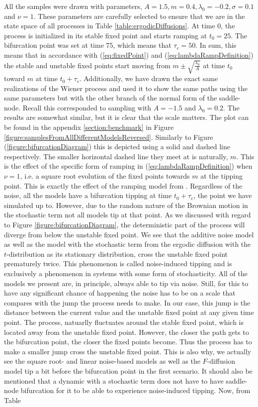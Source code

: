 All the samples were drawn with parameters, $A = 1.5, m = 0.4, \lambda_0 = -0.2, \sigma = 0.1$ and $\nu = 1$. These parameters are carefully selected to ensure that we are in the state space of all processes in Table \ref{table:ergodicDiffusions}. At time $0$, the process is initialized in its stable fixed point and starts ramping at $t_0 = 25$. The bifurcation point was set at time $75$, which means that $\tau_c = 50$. In sum, this means that in accordance with (\ref{eq:fixedPoint}) and (\ref{eq:lambdaRampDefinition}) the stable and unstable fixed points start moving from $m\pm\sqrt{\frac{\lambda_0}{A}}$ at time $t_0$ toward $m$ at time $t_0 + \tau_c$. Additionally, we have drawn the exact same realizations of the Wiener process and used it to show the same paths using the same parameters but with the other branch of the normal form of the saddle-node. Recall this corresponded to sampling with $A = -1.5$ and $\lambda_0 = 0.2$. The results are somewhat similar, but it is clear that the scale matters. The plot can be found in the appendix \ref{section:benchmark} in Figure \ref{figure:samplesFromAllDifferentModelsReversed}. Similarly to Figure (\ref{figure:bifurcationDiagram}) this is depicted using a solid and dashed line respectively. The smaller horizontal dashed line they meet at is naturally, $m$. This is the effect of the specific form of ramping in (\ref{eq:lambdaRampDefinition}) when $\nu = 1$, i.e. a square root evolution of the fixed points towards $m$ at the tipping point. This is exactly the effect of the ramping model from \cite{Ditlevsen2023}. Regardless of the noise, all the models have a bifurcation tipping at time $t_0+\tau_c$, the point we have simulated up to. However, due to the random nature of the Brownian motion in the stochastic term not all models tip at that point. As we discussed with regard to Figure \ref{figure:bifurcationDiagram}, the deterministic part of the process will diverge from below the unstable fixed point. We see that the additive noise model as well as the model with the stochastic term from the ergodic diffusion with the $t$-distribution as its stationary distribution, cross the unstable fixed point prematurely twice. This phenomenon is called noise-induced tipping and is exclusively a phenomenon in systems with some form of stochasticity. All of the models we present are, in principle, always able to tip via noise. Still, for this to have any significant chance of happening the noise has to be on a scale that compares with the jump the process needs to make. In our case, this jump is the distance between the current value and the unstable fixed point at any given time point. The process, natuarlly fluctuates around the stable fixed point, which is located away from the unstable fixed point. However, the closer the path gets to the bifurcation point, the closer the fixed points become. Thus the process has to make a smaller jump cross the unstable fixed point. This is also why, we actually see the square root- and linear noise-based models as well as the $F$-diffusion model tip a bit before the bifurcation point in the first scenario. It should also be mentioned that a dynamic with a stochastic term does not have to have saddle-node bifurcation for it to be able to experience noise-induced tipping. Now, from Table 